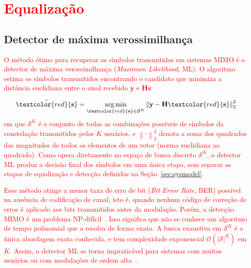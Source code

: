
\section[\texorpdfstring{\textcolor{red}{Equalização}}{Equalização}]{\textcolor{red}{Equalização}}
\label{sec:equalization}

\subsection{Detector de máxima verossimilhança}
\textcolor{red}{O método ótimo para recuperar os símbolos transmitidos em sistemas MIMO é o detector de máxima verossimilhança (\textit{Maximum Likelihood}, ML). O algoritmo estima os símbolos transmitidos encontrando o candidato que minimiza a distância euclidiana entre o sinal recebido $\mathbf{y}$ e $\mathbf{H}\mathbf{s}$:}

\begin{equation}
\hat{\textcolor{red}{\mathbf{s}}} = \underset{\textcolor{red}{\mathbf{s}} \in \mathcal{S}^{K}}{\arg\min}
\left\|\mathbf{y} - \mathbf{H}\textcolor{red}{\mathbf{s}}\right\|_2^2
\label{eq:ml}
\end{equation}
\textcolor{red}{em que $\mathcal{S}^{K}$ é o conjunto de todas as combinações possíveis de símbolos da constelação transmitidos pelos $K$ usuários, e $\left\|\cdot\right\|_2^2$ denota a soma dos quadrados das magnitudes de todos os elementos de um vetor (norma euclidiana ao quadrado). Como opera diretamente no espaço de busca discreto $\mathcal{S}^{K}$, o detector ML produz a decisão final dos símbolos em uma única etapa, sem separar as etapas de equalização e detecção definidas na Seção~\ref{sec:sysmodel}.}

\textcolor{red}{Esse método atinge a menor taxa de erro de bit (\textit{Bit Error Rate}, BER) possível na ausência de codificação de canal, isto é, quando nenhum código de correção de erros é aplicado aos bits transmitidos antes da modulação. Porém, a detecção MIMO é um problema NP-difícil~\cite{zero-forcing}. Isso significa que não se conhece um algoritmo de tempo polinomial que a resolva de forma exata. A busca exaustiva em $\mathcal{S}^{K}$ é a única abordagem exata conhecida, e tem complexidade exponencial $\mathcal{O}(|\mathcal{S}|^K)$ em $K$. Assim, o detector ML se torna impraticável para sistemas com muitos usuários ou com modulações de ordem alta~\cite{bello2022algorithms}.}



